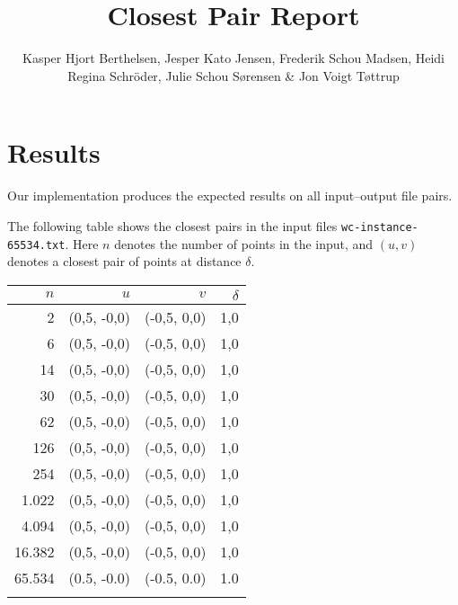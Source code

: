 \documentclass{tufte-handout}
\title{Closest Pair Report}
\author{Kasper Hjort Berthelsen, Jesper Kato Jensen, Frederik Schou Madsen, Heidi Regina Schröder, Julie Schou Sørensen  \& Jon Voigt Tøttrup}
\begin{document}
  \maketitle
  

  \section{Results}

  Our implementation produces the expected results on all input--output file pairs. %

The following table shows the closest pairs in the input files {\tt wc-instance-65534.txt}.
Here $n$ denotes the number of points in the input,
and $(u,v)$ denotes a closest pair of points at distance $\delta$.

  \bigskip\noindent
  \begin{tabular}{rrrr}\toprule
    $n$ 	& $u$ 			& $v$ 			& $\delta$ \\\midrule
	2 		& (0,5, -0,0)	& (-0,5, 0,0) 	& 1,0 \\
	6 		& (0,5, -0,0) 	& (-0,5, 0,0) 	& 1,0 \\
	14 		& (0,5, -0,0) 	& (-0,5, 0,0) 	& 1,0 \\
	30 		& (0,5, -0,0) 	& (-0,5, 0,0) 	& 1,0 \\
	62 		& (0,5, -0,0) 	& (-0,5, 0,0) 	& 1,0 \\
	126 	& (0,5, -0,0) 	& (-0,5, 0,0) 	& 1,0 \\
	254 	& (0,5, -0,0) 	& (-0,5, 0,0) 	& 1,0 \\
	1.022 	& (0,5, -0,0) 	& (-0,5, 0,0) 	& 1,0 \\
	4.094 	& (0,5, -0,0) 	& (-0,5, 0,0) 	& 1,0 \\
	16.382 	& (0,5, -0,0) 	& (-0,5, 0,0) 	& 1,0 \\
    65.534 	& (0.5, -0.0) 	& (-0.5, 0.0) 	& 1.0 \\
\\\bottomrule
  \end{tabular}
\end{document}
